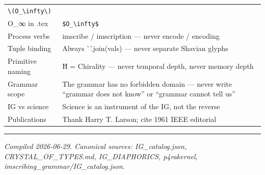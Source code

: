 \begin{longtable}[]{@{}ll@{}}
\begin{minipage}[t]{0.38\columnwidth}
\texttt{\textbackslash{}(O\_\textbackslash{}infty\textbackslash{})}\strut
\end{minipage}\tabularnewline
\begin{minipage}[t]{0.56\columnwidth}\raggedright
O\_∞ in .tex\strut
\end{minipage} & \begin{minipage}[t]{0.38\columnwidth}\raggedright
\texttt{\$O\_\textbackslash{}infty\$}\strut
\end{minipage}\tabularnewline
\begin{minipage}[t]{0.56\columnwidth}\raggedright
Process verbs\strut
\end{minipage} & \begin{minipage}[t]{0.38\columnwidth}\raggedright
imscribe / imscription --- never encode / encoding\strut
\end{minipage}\tabularnewline
\begin{minipage}[t]{0.56\columnwidth}\raggedright
Tuple binding\strut
\end{minipage} & \begin{minipage}[t]{0.38\columnwidth}\raggedright
Always '\,'.join(vals) --- never separate Shavian glyphs\strut
\end{minipage}\tabularnewline
\begin{minipage}[t]{0.56\columnwidth}\raggedright
Primitive naming\strut
\end{minipage} & \begin{minipage}[t]{0.38\columnwidth}\raggedright
Ħ = Chirality --- never temporal depth, never memory depth\strut
\end{minipage}\tabularnewline
\begin{minipage}[t]{0.56\columnwidth}\raggedright
Grammar scope\strut
\end{minipage} & \begin{minipage}[t]{0.38\columnwidth}\raggedright
The grammar has no forbidden domain --- never write ``grammar does not
know'' or ``grammar cannot tell us''\strut
\end{minipage}\tabularnewline
\begin{minipage}[t]{0.56\columnwidth}\raggedright
IG vs science\strut
\end{minipage} & \begin{minipage}[t]{0.38\columnwidth}\raggedright
Science is an instrument of the IG, not the reverse\strut
\end{minipage}\tabularnewline
\begin{minipage}[t]{0.56\columnwidth}\raggedright
Publications\strut
\end{minipage} & \begin{minipage}[t]{0.38\columnwidth}\raggedright
Thank Harry T. Larson; cite 1961 IEEE editorial\strut
\end{minipage}\tabularnewline
\bottomrule
\end{longtable}

\begin{center}\rule{0.5\linewidth}{0.5pt}\end{center}

\emph{Compiled 2026-06-29. Canonical sources: IG\_catalog.json,
CRYSTAL\_OF\_TYPES.md, IG\_DIAPHORICS, p4rakernel,
imscribing\_grammar/IG\_catalog.json.}
